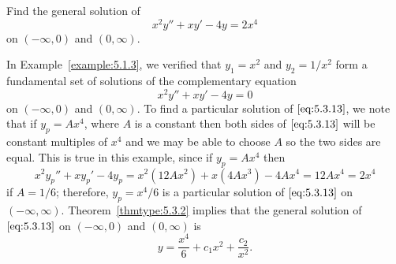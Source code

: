 \documentclass{ximera}
\begin{document}
\begin{example}
\begin{explanation}
\begin{center}
\end{center}
 
 
\end{explanation}
\end{example}
 
\begin{example}\label{example:5.3.3}
Find the general solution of
\begin{equation} \label{eq:5.3.13}
x^2y''+xy'-4y=2x^4
\end{equation}
on $(-\infty,0)$ and $(0,\infty)$.
 
 
\begin{explanation}
In Example~\ref{example:5.1.3},  we verified that $y_1=x^2$ and $y_2=1/x^2$
form a fundamental set of solutions of the complementary equation
$$
x^2y''+xy'-4y=0
$$
on $(-\infty,0)$ and $(0,\infty)$.  To find a particular solution of
$\eqref{eq:5.3.13}$, we note that if
$y_p=Ax^4$, where $A$ is a constant then  both sides of $\eqref{eq:5.3.13}$
will be constant
multiples  of $x^4$ and  we may be able to choose  $A$ so the two sides
are equal. This is true in this example, since if $y_p=Ax^4$ then
$$
x^2y_p''+xy_p'-4y_p=x^2(12Ax^2)+x(4Ax^3)-4Ax^4=12Ax^4=2x^4
$$
if $A=1/6$;  therefore, $y_p=x^4/6$ is a particular solution of
$\eqref{eq:5.3.13}$ on  $(-\infty,\infty)$.
Theorem~\ref{thmtype:5.3.2} implies that the general solution of
$\eqref{eq:5.3.13}$ on  $(-\infty,0)$ and  $(0,\infty)$ is
$$
y=\frac{x^4}{6}+c_1x^2+\frac{c_2}{x^2}.
$$
\end{explanation}
\end{example}
 
\end{document}

